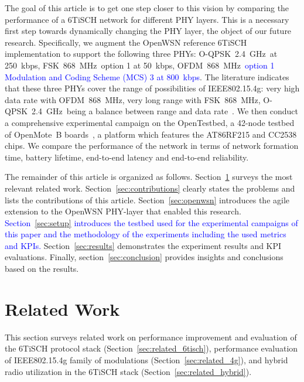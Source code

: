 \documentclass[sensors,article,submit,moreauthors,pdftex]{Definitions/mdpi}
\newcommand{\fsk}           {FSK~868~MHz}
\newcommand{\oqpsk}         {O-QPSK~2.4~GHz}
\newcommand{\ofdm}          {OFDM~868~MHz}
\newcommand{\update}[1]     {\textcolor{blue}{#1}}
\begin{document}

The goal of this article is to get one step closer to this vision by comparing the performance of a 6TiSCH network for different PHY layers.
This is a necessary first step towards dynamically changing the PHY layer,
    the object of our future research.
Specifically, we augment the OpenWSN reference 6TiSCH implementation to support the following three PHYs:
    \oqpsk\ at 250~kbps,
    \fsk\ option 1 at 50~kbps,
    \ofdm\  \update {option 1 Modulation and Coding Scheme (MCS) 3 at 800~kbps}.
The literature indicates that these three PHYs cover the range of possibilities of IEEE802.15.4g:
    very high data rate with \ofdm,
    very long range with \fsk,
    \oqpsk\ being a balance between range and data rate~\cite{munoz19km,draft-munoz-6tisch-multi-phy-nodes,brachmann19ieee}.
We then conduct a comprehensive experimental campaign on the OpenTestbed, a 42-node testbed of OpenMote~B boards~\cite{tuset16openmote}, a platform which features the AT86RF215 and CC2538 chips.
We compare the performance of the network in terms of
    network formation time,
    battery lifetime,
    end-to-end latency and
    end-to-end reliability.


The remainder of this article is organized as follows.
Section~\ref{sec:related} surveys the most relevant related work.
Section~\ref{sec:contributions} clearly states the problems and lists the contributions of this article.
Section~\ref{sec:openwsn} introduces the agile extension to the OpenWSN PHY-layer that enabled this research.
\update {Section~\ref{sec:setup} introduces 
    the testbed used for the experimental campaigns of this paper and
    the methodology of the experiments including the used metrics and KPIs.}
Section~\ref{sec:results} demonstrates the experiment results and KPI evaluations.
Finally, section~\ref{sec:conclusion} provides insights and conclusions based on the results.

\section{Related Work}
\label{sec:related}


This section surveys related work on
    performance improvement and evaluation of the 6TiSCH protocol stack (Section~\ref{sec:related_6tisch}),
    performance evaluation of IEEE802.15.4g family of modulations (Section~\ref{sec:related_4g}), and
    hybrid radio utilization in the 6TiSCH stack  (Section~\ref{sec:related_hybrid}). 
\end{document}
